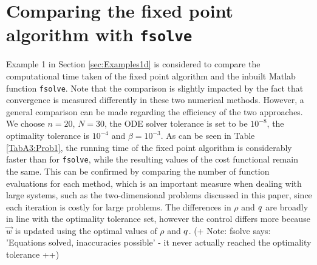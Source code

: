 \section{Comparing the fixed point algorithm with \texttt{fsolve}}
\label{app:fsolveComparison}

Example 1 in Section \ref{sec:Examples1d} is considered to compare the computational time taken of the fixed point algorithm and the inbuilt Matlab function \texttt{fsolve}. Note that the comparison is slightly impacted by the fact that convergence is measured differently in these two numerical methods. However, a general comparison can be made regarding the efficiency of the two approaches.
We choose $n=20$, $N=30$, the ODE solver tolerance is set to be $10^{-8}$, the optimality tolerance is $10^{-4}$ and $\beta = 10^{-3}$. 
As can be seen in Table \ref{TabA3:Prob1}, the running time of the fixed point algorithm is considerably faster than for \texttt{fsolve}, while the resulting values of the cost functional remain the same. This can be confirmed by comparing the number of function evaluations for each method, which is an important measure when dealing with large systems, such as the two-dimensional problems discussed in this paper, since each iteration is costly for large problems. The differences in $\rho$ and $q$ are broadly in line with the optimality tolerance set, however the control differs more because $\vec{w}$ is updated using the optimal values of $\rho$ and $q$. (+ Note: fsolve says: 'Equations solved, inaccuracies possible' - it never actually reached the optimality tolerance ++)

